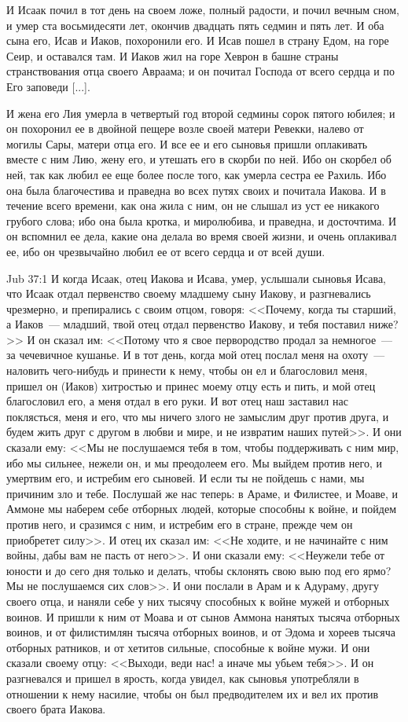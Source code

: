 И Исаак почил в тот день на своем ложе, полный
радости, и почил вечным сном, и умер ста
восьмидесяти лет, окончив двадцать пять седмин и
пять лет. И оба сына его, Исав и Иаков, похоронили
его. И Исав пошел в страну Едом, на горе Сеир, и
оставался там. И Иаков жил на горе Хеврон в башне
страны странствования отца своего Авраама; и он
почитал Господа от всего сердца и по Его заповеди
[...].

И жена его Лия умерла в четвертый год второй
седмины сорок пятого юбилея; и он похоронил ее в
двойной пещере возле своей матери Ревекки,
налево от могилы Сары, матери отца его. И все ее и
его сыновья пришли оплакивать вместе с ним Лию,
жену его, и утешать его в скорби по ней. Ибо он
скорбел об ней, так как любил ее еще более после
того, как умерла сестра ее Рахиль. Ибо она была
благочестива и праведна во всех путях своих и
почитала Иакова. И в течение всего времени, как
она жила с ним, он не слышал из уст ее никакого
грубого слова; ибо она была кротка, и миролюбива,
и праведна, и досточтима. И он вспомнил ее дела,
какие она делала во время своей жизни, и очень
оплакивал ее, ибо он чрезвычайно любил ее от
всего сердца и от всей души.

\vs Jub 37:1
И когда Исаак, отец Иакова и Исава, умер,
услышали сыновья Исава, что Исаак отдал
первенство своему младшему сыну Иакову, и
разгневались чрезмерно, и препирались с своим
отцом, говоря: <<Почему, когда ты старший, а
Иаков~--- младший, твой отец отдал первенство
Иакову, и тебя поставил ниже?>> И он сказал им:
<<Потому что я свое первородство продал за
немногое~--- за чечевичное кушанье. И в тот день,
когда мой отец послал меня на охоту~--- наловить
чего-нибудь и принести к нему, чтобы он ел и
благословил меня, пришел он (Иаков) хитростью и
принес моему отцу есть и пить, и мой отец
благословил его, а меня отдал в его руки. И вот
отец наш заставил нас поклясться, меня и его, что
мы ничего злого не замыслим друг против друга, и
будем жить друг с другом в любви и мире, и не
извратим наших путей>>. И они сказали ему: <<Мы
не послушаемся тебя в том, чтобы поддерживать с
ним мир, ибо мы сильнее, нежели он, и мы преодолеем
его. Мы выйдем против него, и умертвим его, и
истребим его сыновей. И если ты не пойдешь с нами,
мы причиним зло и тебе. Послушай же нас теперь: в
Араме, и Филистее, и Моаве, и Аммоне мы наберем
себе отборных людей, которые способны к войне, и
пойдем против него, и сразимся с ним, и истребим
его в стране, прежде чем он приобретет силу>>. И
отец их сказал им: <<Не ходите, и не начинайте с
ним войны, дабы вам не пасть от него>>. И они
сказали ему: <<Неужели тебе от юности и до сего
дня только и делать, чтобы склонять свою выю под
его ярмо? Мы не послушаемся сих слов>>. И они
послали в Арам и к Адураму, другу своего отца, и
наняли себе у них тысячу способных к войне мужей
и отборных воинов. И пришли к ним от Моава и от
сынов Аммона нанятых тысяча отборных воинов, и от
филистимлян тысяча отборных воинов, и от Эдома и
хореев тысяча отборных ратников, и от хетитов
сильные, способные к войне мужи. И они сказали
своему отцу: <<Выходи, веди нас! а иначе мы убьем
тебя>>. И он разгневался и пришел в ярость, когда
увидел, как сыновья употребляли в отношении к
нему насилие, чтобы он был предводителем их и вел
их против своего брата Иакова.

